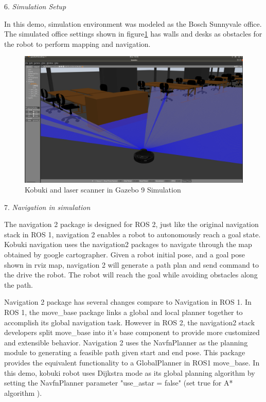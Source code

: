 \documentclass[letterpaper, 10 pt, conference]{ieeeconf}  %
\begin{document}
6. \textit{Simulation Setup} \par\vspace{5pt} 
In this demo, simulation environment was modeled as the Bosch Sunnyvale office. The simulated office settings shown in figure\ref{fig:gazebo} has walls and desks as obstacles for the robot to perform mapping and navigation.
\begin{figure}[htp!]
  \includegraphics[width=\linewidth]{gazebo_simulation.png}
  \caption{Kobuki and laser scanner in Gazebo 9 Simulation } 
  \label{fig:gazebo}
\end{figure}

7. \textit{Navigation in simulation} \par\vspace{5pt} 
The navigation 2 package is designed for ROS 2, just like the original navigation stack in ROS 1, navigation 2 enables a robot to autonomously reach a goal state. Kobuki navigation uses the navigation2 packages to navigate through the map obtained by google cartographer. Given a robot initial pose, and a goal pose shown in rviz map, navigation 2 will generate a path plan and send command to the drive the robot. The robot will reach the goal while avoiding obstacles along the path. 

Navigation 2 package has several changes compare to Navigation in ROS 1. In ROS 1, the move\_base package links a global and local planner together to accomplish its global navigation task\cite{c8}. However in ROS 2, the navigation2 stack developers split move\_base into it's base component to provide more customized and extensible behavior. Navigation 2 uses the NavfnPlanner as the planning module to generating a feasible path given start and end pose. This package provides the equivalent functionality to a GlobalPlanner in ROS1 move\_base. In this demo, kobuki robot uses Dijkstra mode as its global planning algorithm by setting the NavfnPlanner parameter "use\_astar = false" (set true for A* algorithm ). 
\end{document}
